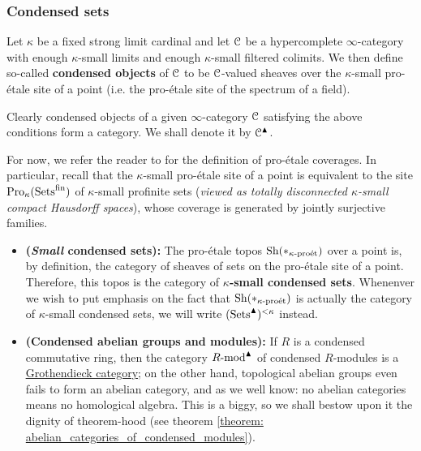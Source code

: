         \subsubsection{Condensed sets}
            \begin{definition}[Condensation] \label{def: condensation}
                Let $\kappa$ be a fixed strong limit cardinal and let $\mathcal{C}$ be a hypercomplete $\infty$-category with enough $\kappa$-small limits and enough $\kappa$-small filtered colimits. We then define so-called \textbf{condensed objects} of $\mathcal{C}$ to be $\mathcal{C}$-valued sheaves over the $\kappa$-small pro-\'etale site of a point (i.e. the pro-\'etale site of the spectrum of a field). 
                
                Clearly condensed objects of a given $\infty$-category $\mathcal{C}$ satisfying the above conditions form a category. We shall denote it by $\mathcal{C}^{\blacktriangle}$.
            \end{definition}
            \begin{remark}
                For now, we refer the reader to \cite[Definition 4.1.1 and Remark 4.1.3]{bhatt_scholze_2014_pro_etale} for the definition of pro-\'etale coverages. In particular, recall that the $\kappa$-small pro-\'etale site of a point is equivalent to the site $\mathrm{Pro}_{\kappa}(\mathrm{Sets}^{\mathrm{fin}})$ of $\kappa$-small profinite sets (\textit{viewed as totally disconnected $\kappa$-small compact Hausdorff spaces}), whose coverage is generated by jointly surjective families. 
            \end{remark}
            \begin{example}
                \noindent
                \begin{itemize}
                    \item \textbf{(\textit{Small} condensed sets):} The pro-\'etale topos $\mathrm{Sh}(*_{\kappa\text{-}\mathrm{pro\acute{e}t}})$ over a point is, by definition, the category of sheaves of sets on the pro-\'etale site of a point. Therefore, this topos is the category of \textbf{$\kappa$-small condensed sets}. Whenenver we wish to put emphasis on the fact that $\mathrm{Sh}(*_{\kappa\text{-}\mathrm{pro\acute{e}t}})$ is actually the category of $\kappa$-small condensed sets, we will write $(\mathrm{Sets}^{\blacktriangle})^{< \kappa}$ instead.
                    \item \textbf{(Condensed abelian groups and modules):} If $R$ is a condensed commutative ring, then the category $R\text{-}\mathrm{mod}^{\blacktriangle}$ of condensed $R$-modules is a \href{https://ncatlab.org/nlab/show/Grothendieck+category}{\underline{Grothendieck category}}; on the other hand, topological abelian groups even fails to form an abelian category, and as we well know: no abelian categories means no homological algebra. This is a biggy, so we shall bestow upon it the dignity of theorem-hood (see theorem \ref{theorem: abelian_categories_of_condensed_modules}).
                \end{itemize}
            \end{example}
